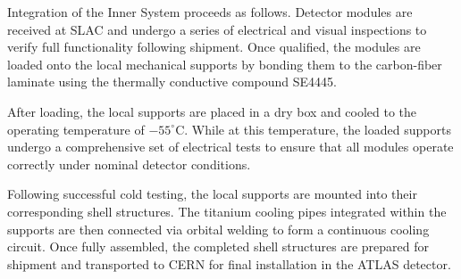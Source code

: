 Integration of the Inner System proceeds as follows. 
Detector modules are received at SLAC and undergo a series of electrical and visual inspections to verify full functionality following shipment. 
Once qualified, the modules are loaded onto the local mechanical supports by bonding them to the carbon-fiber laminate using the thermally conductive compound SE4445.

After loading, the local supports are placed in a dry box and cooled to the operating temperature of \(-55^\circ\)C. 
While at this temperature, the loaded supports undergo a comprehensive set of electrical tests to ensure that all modules operate correctly under nominal detector conditions.

Following successful cold testing, the local supports are mounted into their corresponding shell structures. 
The titanium cooling pipes integrated within the supports are then connected via orbital welding to form a continuous cooling circuit. 
Once fully assembled, the completed shell structures are prepared for shipment and transported to CERN for final installation in the ATLAS detector.